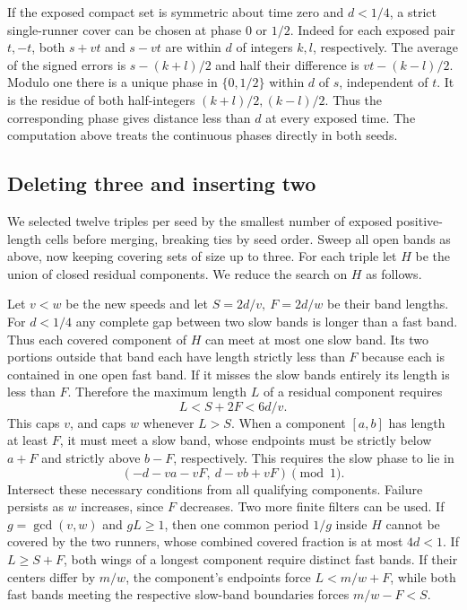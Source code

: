 \documentclass[11pt]{article}
\begin{document}
If the exposed compact set is symmetric about time zero and
\(d<1/4\), a strict single-runner cover can be chosen at phase \(0\)
or \(1/2\). Indeed for each exposed pair \(t,-t\), both \(s+vt\) and
\(s-vt\) are within \(d\) of integers \(k,l\), respectively.
The average of the signed errors is \(s-(k+l)/2\) and half their
difference is \(vt-(k-l)/2\). Modulo one there is a unique phase in
\(\{0,1/2\}\) within \(d\) of \(s\), independent of \(t\).
It is the residue of both half-integers \((k+l)/2,(k-l)/2\).
Thus the corresponding phase gives distance less than \(d\) at every
exposed time. The computation above treats the continuous phases
directly in both seeds.

\subsection*{Deleting three and inserting two}

We selected twelve triples per seed by the smallest number of exposed
positive-length cells before merging, breaking ties by seed order.
Sweep all open bands as above, now keeping covering sets of size up
to three. For each triple let \(H\) be the union of closed residual
components. We reduce the search on \(H\) as follows.

Let \(v<w\) be the new speeds and let \(S=2d/v,\ F=2d/w\) be their
band lengths. For \(d<1/4\) any complete gap between two slow
bands is longer than a fast band. Thus each covered component of
\(H\) can meet at most one slow band. Its two portions outside that
band each have length strictly less than \(F\) because each is
contained in one open fast band. If it misses the slow bands
entirely its length is less than \(F\). Therefore the maximum length
\(L\) of a residual component requires
\[
  L<S+2F<6d/v .
\]
This caps \(v\), and caps \(w\) whenever \(L>S\).
When a component \([a,b]\) has length at least \(F\), it must meet
a slow band, whose endpoints must be strictly below \(a+F\)
and strictly above \(b-F\), respectively. This requires the slow
phase to lie in
\[
   (-d-va-vF,\ d-vb+vF)\pmod1 .
\]
Intersect these necessary conditions from all qualifying components.
Failure persists as \(w\) increases, since \(F\) decreases.
Two more finite filters can be used. If \(g=\gcd(v,w)\) and
\(gL\ge1\), then one common period \(1/g\) inside \(H\) cannot be
covered by the two runners, whose combined covered fraction is
at most \(4d<1\). If \(L\ge S+F\), both wings of a longest component
require distinct fast bands. If their centers differ by \(m/w\),
the component's endpoints force \(L<m/w+F\), while both fast bands
meeting the respective slow-band boundaries forces \(m/w-F<S\).
\end{document}
